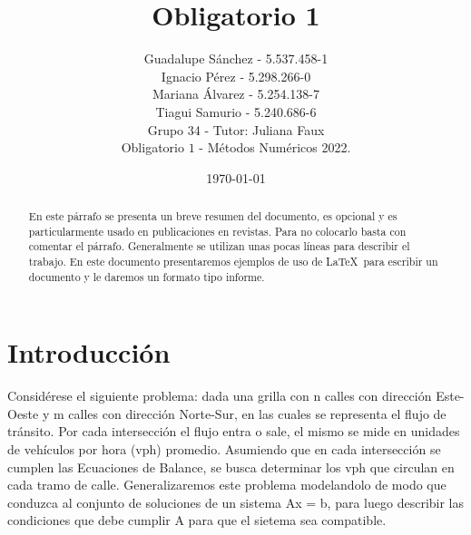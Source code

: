 \documentclass[a4paper,11pt]{article}
\title{Obligatorio 1}
\author{%
  Guadalupe Sánchez - 5.537.458-1\\ %
  Ignacio Pérez - 5.298.266-0\\ %
  Mariana Álvarez - 5.254.138-7\\ %
  Tiagui Samurio - 5.240.686-6\\ %
  Grupo 34 - Tutor: Juliana Faux \\ %
  Obligatorio $1$ - Métodos Numéricos 2022.}
\date{\today} %
\begin{document}
	
\renewcommand{\tablename}{\bfseries Tabla} %
\renewcommand{\figurename}{\bfseries Figura} %
%
\maketitle


\begin{abstract}
En este párrafo se presenta un breve resumen del documento, es opcional y es particularmente usado en publicaciones en revistas. Para no colocarlo basta con comentar el párrafo. %
Generalmente se utilizan unas pocas líneas para describir el trabajo. %
En este documento presentaremos ejemplos de uso de \LaTeX~para escribir un documento y le daremos un formato tipo informe.
\end{abstract}

\tableofcontents

\newpage


\section{Introducción}
%
Considérese el siguiente problema: dada una grilla con n calles con dirección Este-Oeste y m calles con dirección Norte-Sur, en las cuales se representa el flujo de tránsito. Por cada intersección el flujo entra o sale, el mismo se mide en unidades de vehículos por hora (vph) promedio. Asumiendo que en cada intersección se cumplen las Ecuaciones de Balance, se busca determinar los vph que circulan en cada tramo de calle.
Generalizaremos este problema modelandolo de modo que conduzca al conjunto de soluciones de un sistema Ax = b, para luego describir las condiciones que debe cumplir A para que el sietema sea compatible.

\setlength{\parskip}{8mm}
\end{document}
